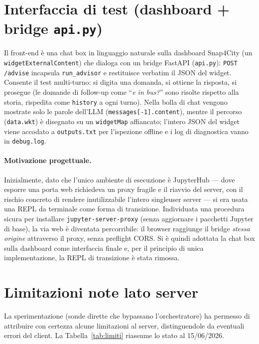 \documentclass[11pt,a4paper]{article}
\begin{document}
\section{Interfaccia di test (dashboard + bridge \texttt{api.py})}
Il front-end è una chat box in linguaggio naturale sulla dashboard Snap4City (un
\texttt{widgetExternalContent}) che dialoga con un bridge FastAPI
(\texttt{api.py}): \texttt{POST /advise} incapsula \texttt{run\_advisor} e
restituisce verbatim il JSON del widget. Consente il test multi-turno: si digita
una domanda, si ottiene la risposta, si prosegue (le domande di follow-up come
``\textit{e in bus?}'' sono risolte rispetto alla storia, rispedita come
\texttt{history} a ogni turno). Nella bolla di chat vengono mostrate solo le
parole dell'LLM (\texttt{messages[-1].content}), mentre il percorso
(\texttt{data.wkt}) è disegnato su un \texttt{widgetMap} affiancato; l'intero
JSON del widget viene accodato a \texttt{outputs.txt} per l'ispezione offline e
i log di diagnostica vanno in \texttt{debug.log}.

\paragraph{Motivazione progettuale.} Inizialmente, dato che l'unico ambiente di
esecuzione è JupyterHub --- dove esporre una porta web richiedeva un proxy
fragile e il riavvio del server, con il rischio concreto di rendere
inutilizzabile l'intero singleuser server --- si era usata una REPL da terminale
come forma di transizione. Individuata una procedura sicura per installare
\texttt{jupyter-server-proxy} (senza aggiornare i pacchetti Jupyter di base), la
via web è diventata percorribile: il browser raggiunge il bridge \emph{stessa
origine} attraverso il proxy, senza preflight CORS. Si è quindi adottata la chat
box sulla dashboard come interfaccia finale e, per il principio di unica
implementazione, la REPL di transizione è stata rimossa.

\section{Limitazioni note lato server}
La sperimentazione (sonde dirette che bypassano l'orchestratore) ha permesso di
attribuire con certezza alcune limitazioni al server, distinguendole da
eventuali errori del client. La Tabella~\ref{tab:limiti} riassume lo stato
al 15/06/2026.
\end{document}
